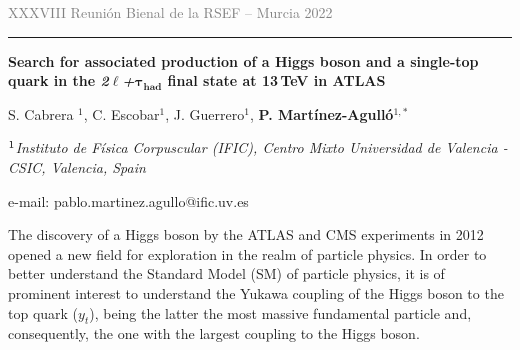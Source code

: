 \documentclass[a4paper,10pt]{article}
\newcommand{\yt}{\ensuremath{y_{t}}}
\begin{document}
	

\begin{center}
\vspace*{-2.2cm}
{\noindent\textsf{\textcolor{gray}{XXXVIII Reuni\'on Bienal de la RSEF  -- Murcia 2022}}}
\vspace{0.1cm}
\hrule
\vspace{0.1cm}		
\end{center}
\vspace{0.6cm}
	

\begin{center}
\textbf{\LARGE\textsf{Search for associated production of a Higgs boson and 
a single-top quark in the \textit{2$\boldsymbol{\ell}$+$\boldsymbol{\tau_{had}}$} final state at 13$\,$TeV in ATLAS}}
\bigskip

{\large
\textsf{
S. Cabrera $^1$,
C. Escobar$^1$,
J. Guerrero$^1$,
{\textbf{P. Mart\'inez-Agull\'o}}$^{1,*}$
 }}
\medskip


\textit{\textsf{{$^{\rm 1}$}Instituto de F\' isica Corpuscular (IFIC), 
 Centro Mixto Universidad de Valencia - CSIC, Valencia, Spain}}
\end{center}	
\vspace*{-0.2cm}

\centerline{\textsf{\small *e-mail: pablo.martinez.agullo@ific.uv.es}}
\bigskip



The discovery of a Higgs boson by the ATLAS and CMS experiments in 2012 opened 
a new field for exploration in the realm of particle physics. In order to better understand 
the Standard Model (SM) of particle physics, it is of prominent interest to understand the Yukawa coupling of 
the Higgs boson to the top quark (\yt), being the latter the most massive fundamental particle 
and, consequently, the one with the largest coupling to the Higgs boson.
\end{document}
